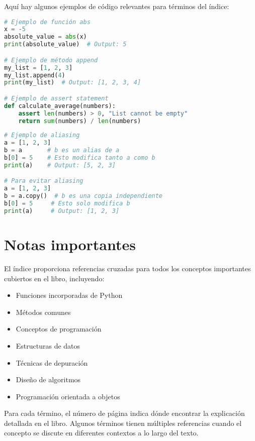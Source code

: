 Aquí hay algunos ejemplos de código relevantes para términos del índice:

\begin{lstlisting}[language=Python]
# Ejemplo de función abs
x = -5
absolute_value = abs(x)
print(absolute_value)  # Output: 5

# Ejemplo de método append
my_list = [1, 2, 3]
my_list.append(4)
print(my_list)  # Output: [1, 2, 3, 4]

# Ejemplo de assert statement
def calculate_average(numbers):
    assert len(numbers) > 0, "List cannot be empty"
    return sum(numbers) / len(numbers)
\end{lstlisting}

\begin{lstlisting}[language=Python]
# Ejemplo de aliasing
a = [1, 2, 3]
b = a       # b es un alias de a
b[0] = 5    # Esto modifica tanto a como b
print(a)    # Output: [5, 2, 3]

# Para evitar aliasing
a = [1, 2, 3]
b = a.copy()  # b es una copia independiente
b[0] = 5     # Esto solo modifica b
print(a)     # Output: [1, 2, 3]
\end{lstlisting}

\section{Notas importantes}

El índice proporciona referencias cruzadas para todos los conceptos importantes cubiertos en el libro, incluyendo:

\begin{itemize}
\item Funciones incorporadas de Python
\item Métodos comunes
\item Conceptos de programación
\item Estructuras de datos
\item Técnicas de depuración
\item Diseño de algoritmos
\item Programación orientada a objetos
\end{itemize}

Para cada término, el número de página indica dónde encontrar la explicación detallada en el libro. Algunos términos tienen múltiples referencias cuando el concepto se discute en diferentes contextos a lo largo del texto.